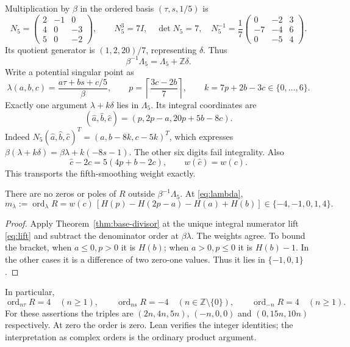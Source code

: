 Multiplication by $\beta$ in the ordered basis $(\tau,s,1/5)$ is
\[
 N_5=\begin{pmatrix}2&-1&0\\4&0&-3\\5&0&-2\end{pmatrix},\qquad
 N_5^3=7I,\quad\det N_5=7,\quad
 N_5^{-1}=\frac17\begin{pmatrix}0&-2&3\\-7&-4&6\\0&-5&4\end{pmatrix}.
\]
Its quotient generator is $(1,2,20)/7$, representing $\delta$. Thus
\[
 \beta^{-1}\Lambda_5=\Lambda_5+\mathbb Z\delta.
\]
Write a potential singular point as
\begin{equation}\label{eq:lambda}
 \lambda(a,b,c)=\frac{a\tau+bs+c/5}{\beta},\qquad
 p=\left\lceil\frac{3c-2b}{7}\right\rceil,\qquad
 k=7p+2b-3c\in\{0,\ldots,6\}.
\end{equation}
Exactly one argument $\lambda+k\delta$ lies in $\Lambda_5$. Its integral coordinates are
\begin{equation}\label{eq:lift}
 (\widehat a,\widehat b,\widehat c)=(p,2p-a,20p+5b-8c).
\end{equation}
Indeed $N_5(\widehat a,\widehat b,\widehat c)^T=(a,b-8k,c-5k)^T$, which expresses $\beta(\lambda+k\delta)=\beta\lambda+k(-8s-1)$. The other six digits fail integrality. Also
\[
 \widehat c-2c=5(4p+b-2c),\qquad w(\widehat c)=w(c).
\]
This transports the fifth-smoothing weight exactly.

\begin{theorem}\label{thm:complete-divisor}
There are no zeros or poles of $R$ outside $\beta^{-1}\Lambda_5$. At \eqref{eq:lambda},
\begin{equation}\label{eq:complete-divisor}
 m_\lambda:=\operatorname{ord}_{\lambda}R
 =w(c)\,[H(p)-H(2p-a)-H(a)+H(b)]\in\{-4,-1,0,1,4\}.
\end{equation}
\end{theorem}
\begin{proof}
Apply Theorem~\ref{thm:base-divisor} at the unique integral numerator lift \eqref{eq:lift} and subtract the denominator order at $\beta\lambda$. The weights agree. To bound the bracket, when $a\le0,p>0$ it is $H(b)$; when $a>0,p\le0$ it is $H(b)-1$. In the other cases it is a difference of two zero-one values. Thus it lies in $\{-1,0,1\}$.
\end{proof}
In particular,
\[
 \operatorname{ord}_{n\tau}R=4\quad(n\ge1),\qquad
 \operatorname{ord}_{ns}R=-4\quad(n\in\mathbb Z\setminus\{0\}),\qquad
 \operatorname{ord}_{-n}R=4\quad(n\ge1).
\]
For these assertions the triples are $(2n,4n,5n)$, $(-n,0,0)$ and $(0,15n,10n)$ respectively. At zero the order is zero. Lean verifies the integer identities; the interpretation as complex orders is the ordinary product argument.

